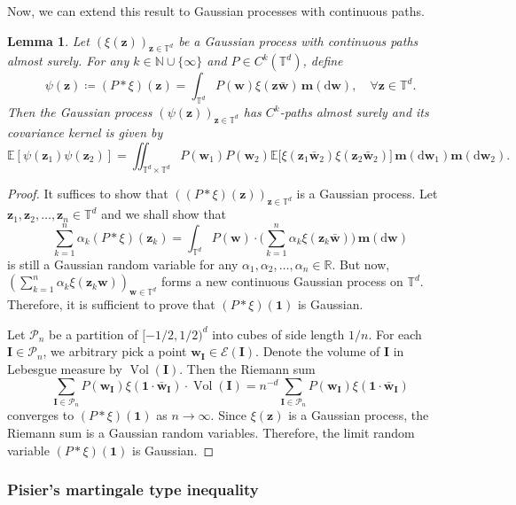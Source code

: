 \documentclass[12pt]{amsart}
\newtheorem{lemma}[theorem]{Lemma}
\theoremstyle{definition}
\theoremstyle{remark}
\newcommand{\bz}{\boldsymbol{z}}
\newcommand{\bw}{\boldsymbol{w}}
\newcommand{\R}{\mathbb{R}}
\newcommand{\N}{\mathbb{N}}
\newcommand{\E}{\mathbb{E}}
\newcommand{\T}{\mathbb{T}}
\numberwithin{equation}{section}
\begin{document}
Now, we can extend this result to Gaussian processes with continuous paths.
\begin{lemma}\label{lemma:mollification-Gaussian-process}
	Let $(\xi(\bz))_{\bz\in \T^d}$ be a Gaussian process with continuous paths almost surely.
	For any $k\in \N\cup\{\infty\}$ and $P\in C^k(\T^d)$, define
	\[
	\psi(\bz)\coloneq (P*\xi)(\bz)=\int_{\T^d} P(\bw)\xi(\bz\bar{\bw})\,\boldsymbol{m}(\mathrm{d}\bw),\quad \forall \bz\in \T^d.
	\]
	Then the Gaussian process $(\psi(\bz))_{\bz\in \T^d}$ has $C^k$-paths almost surely and its covariance kernel  is  given by
	\[
	\E[\psi(\bz_1)\psi(\bz_2)]=\iint_{\T^d\times \T^d} P(\bw_1)P(\bw_2)\E\big[\xi(\bz_1\bar{\bw}_2)\xi(\bz_2\bar{\bw}_2)\big]\,\boldsymbol{m}(\mathrm{d}\bw_1)\boldsymbol{m}(\mathrm{d}\bw_2).
	\]
\end{lemma}
\begin{proof}
	It suffices to show that $((P*\xi)(\bz))_{\bz\in \T^d}$ is a Gaussian process. Let $\bz_1,\bz_2,\ldots,\bz_n\in \T^d$ and we shall show that
	\[
	\sum_{k=1}^n \alpha_k (P*\xi)(\bz_k)=\int_{\T^d} P(\bw)\cdot \bigg(\sum_{k=1}^n \alpha_k \xi(\bz_k\bar{\bw} )\bigg)\,\boldsymbol{m}(\mathrm{d}\bw)
	\]
	is still a Gaussian random variable for any $\alpha_1,\alpha_2,\ldots,\alpha_n\in \R$. But now, $(\sum_{k=1}^n \alpha_k \xi(\bz_k\bw))_{\bw\in \T^d}$ forms a new continuous Gaussian process on $\T^d$. Therefore, it is sufficient to prove that $(P*\xi)(\boldsymbol{1})$ is Gaussian.
	
	Let $\mathcal{P}_n$ be a partition of $[-1/2,1/2)^d$ into cubes of side length $1/n$. For each $\boldsymbol{I}\in \mathcal{P}_n$, we arbitrary pick a point $\bw_{\boldsymbol{I}}\in \mathcal{E}(\boldsymbol{I})$. Denote the volume of $\boldsymbol{I}$ in Lebesgue measure by $\operatorname{Vol}(\boldsymbol{I})$. Then the Riemann sum
	\[
	\sum_{\boldsymbol{I}\in \mathcal{P}_n} P(\bw_{\boldsymbol{I}})\xi(\boldsymbol{1}\cdot \bar{\bw}_{\boldsymbol{I}})\cdot \operatorname{Vol}(\boldsymbol{I})=n^{-d}\sum_{\boldsymbol{I}\in \mathcal{P}_n} P(\bw_{\boldsymbol{I}})\xi(\boldsymbol{1}\cdot\bar{\bw}_{\boldsymbol{I}})
	\]
	converges to $(P*\xi)(\boldsymbol{1})$ as $n\to \infty$. Since $\xi(\bz)$ is a Gaussian process, the Riemann sum is a Gaussian random variables. Therefore, the limit random variable $(P*\xi)(\boldsymbol{1})$ is Gaussian.
\end{proof}

\subsubsection{Pisier's martingale type inequality}\label{sssec:Pisier-mar-p-ineq}
\end{document}
